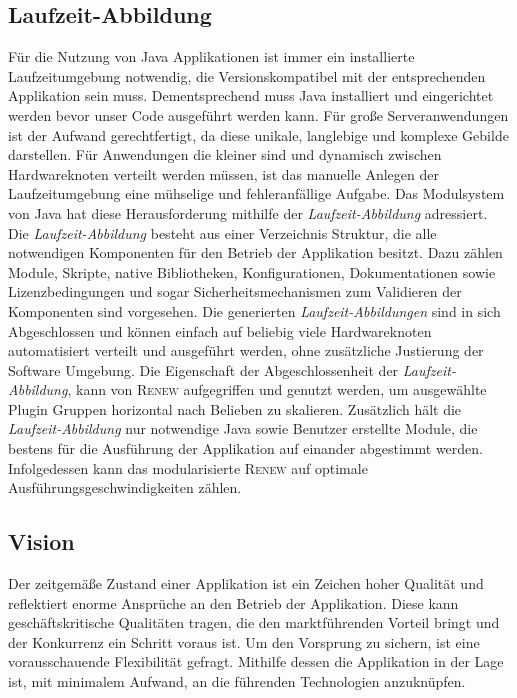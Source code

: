 	\subsection{Laufzeit-Abbildung} \label{sub:laufzeit_images}
		Für die Nutzung von Java Applikationen ist immer ein installierte Laufzeitumgebung notwendig, die Versionskompatibel mit der entsprechenden Applikation sein muss. Dementsprechend muss Java installiert und eingerichtet werden bevor unser Code ausgeführt werden kann. Für große Serveranwendungen ist der Aufwand gerechtfertigt, da diese unikale, langlebige und komplexe Gebilde darstellen. Für Anwendungen die kleiner sind und dynamisch zwischen Hardwareknoten verteilt werden müssen, ist das manuelle Anlegen der Laufzeitumgebung eine mühselige und fehleranfällige Aufgabe. \newline
		Das Modulsystem von Java hat diese Herausforderung mithilfe der \textit{Laufzeit-Abbildung} adressiert. Die \textit{Laufzeit-Abbildung} besteht aus einer Verzeichnis Struktur, die alle notwendigen Komponenten für den Betrieb der Applikation besitzt. Dazu zählen Module, Skripte, native Bibliotheken, Konfigurationen, Dokumentationen sowie Lizenzbedingungen und sogar Sicherheitsmechanismen zum Validieren der Komponenten sind vorgesehen. Die generierten \textit{Laufzeit-Abbildungen} sind in sich Abgeschlossen und können einfach auf beliebig viele Hardwareknoten automatisiert verteilt und ausgeführt werden, ohne zusätzliche Justierung der Software Umgebung. \bigbreak
		Die Eigenschaft der Abgeschlossenheit der \textit{Laufzeit-Abbildung}, kann von \textsc{Renew} aufgegriffen und genutzt werden, um ausgewählte Plugin Gruppen horizontal nach Belieben zu skalieren. Zusätzlich hält die \textit{Laufzeit-Abbildung} nur notwendige Java sowie Benutzer erstellte Module, die bestens für die Ausführung der Applikation auf einander abgestimmt werden. Infolgedessen kann das modularisierte \textsc{Renew} auf optimale Ausführungsgeschwindigkeiten zählen. 

	\subsection{Vision} \label{sub:moderner_zustand}
		Der zeitgemäße Zustand einer Applikation ist ein Zeichen hoher Qualität und reflektiert enorme Ansprüche an den Betrieb der Applikation. Diese kann geschäftskritische Qualitäten tragen, die den marktführenden Vorteil bringt und der Konkurrenz ein Schritt voraus ist. Um den Vorsprung zu sichern, ist eine vorausschauende Flexibilität gefragt. Mithilfe dessen die Applikation in der Lage ist, mit minimalem Aufwand, an die führenden Technologien anzuknüpfen.

